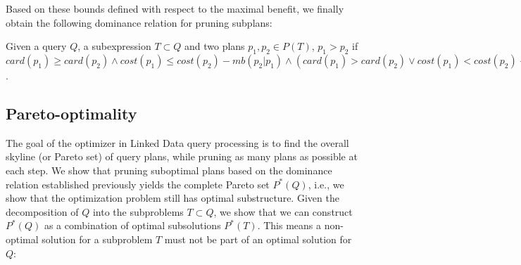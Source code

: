 %
  
Based on these bounds defined with respect to the maximal benefit, we finally obtain the following dominance relation for
pruning subplans:

\begin{theorem}
  Given a query $Q$, a subexpression $T \subset Q$ and two plans
  $p_1,p_2 \in P(T)$, $p_1 > p_2$ if
  $card(p_1) \geq card(p_2) \wedge cost(p_1) \leq cost(p_2) -
  mb(p_2|p_1) \wedge (card(p_1) > card(p_2) \vee cost(p_1) <
  cost(p_2) - mb(p_2|p_1))$.
\end{theorem}


\subsection{Pareto-optimality}
\label{sec:pareto}

The goal of the optimizer in Linked Data query processing 
is to find the overall skyline (or Pareto set) of query plans, while
pruning as many plans as possible at each step. We show that pruning suboptimal plans based on the dominance relation established previously yields the complete Pareto set $P^*(Q)$, i.e., we show that the optimization
problem still has optimal substructure.
Given the decomposition of $Q$ into the subproblems $T \subset Q$, we show that we can construct $P^*(Q)$ as a combination of optimal subsolutions $P^*(T)$.  This means a
non-optimal solution for a subproblem $T$ must not be part of an optimal
solution for $Q$:

